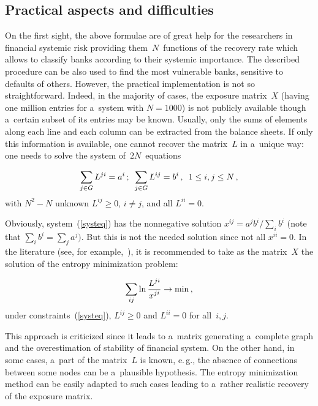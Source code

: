 \begin{multicols}{2}
\subsection{Practical aspects and difficulties}

\vspace*{-2pt}

\noindent
On the first sight, the above formulae are of great help for the researchers in 
financial systemic risk providing them~$N$~functions of the recovery rate which 
allows  to  classify banks according to their systemic importance. The 
described procedure  can be also used to find the most vulnerable banks, 
sensitive to defaults of others. However, the practical implementation is not so 
straightforward. 
Indeed, in the majority of cases, the exposure matrix~$X$ (having one million 
entries for a~system with $N=1000$) is not publicly available
though a~certain  subset of its entries may be known.   
Usually, only the  sums of  elements along  each line and each column can be 
extracted from the balance sheets.  
If only this information is available, one cannot recover  the matrix~$L$ in 
a~unique way: one needs to solve the system of~$2N$~equations

\noindent
\begin{equation}
\label{systeq}
\sum\limits_{j\in G} L^{ji}=a^i\,; \enskip 
\sum\limits_{j\in G} L^{ij}=b^i\,, \enskip 1\le i,j\le N\,, 
\end{equation}
with $N^2-N$ unknown $L^{ij}\ge 0$, $i\neq j$,  and all $L^{ii}=0$.   

Obviously, system~(\ref{systeq}) has the nonnegative solution 
$x^{ij}=a^jb^i/\sum\nolimits_ib^i$ (note that $\sum\nolimits_ib^i=\sum\nolimits_ja^j)$. 
But this is not the needed solution since not all $x^{ii}=0$. In the literature 
(see, for example,~\cite{Mistrulli}), it is recommended to take as the matrix~$X$ the solution 
of the entropy minimization problem: 

\noindent
$$
\sum\limits_{ij}\ln\displaystyle\frac{\displaystyle L^{ji}\mathstrut}{\displaystyle x^{ji}\mathstrut}\to \min\,,
$$  
under constraints~(\ref{systeq}),  $L^{ij}\ge 0$ and  $L^{ii}=0$ for all~$i,j$. 

This approach is  criticized since it leads to a~matrix generating a~complete 
graph and the overestimation of stability 
of financial system. On the other hand, in some cases,  a~part of the matrix~$L$ 
is known, e.\,g., the  absence of  connections 
between some nodes can be a~plausible hypothesis. The entropy minimization 
method can be easily adapted to such cases leading  to a~rather realistic 
recovery of the exposure matrix.   


\end{multicols}
